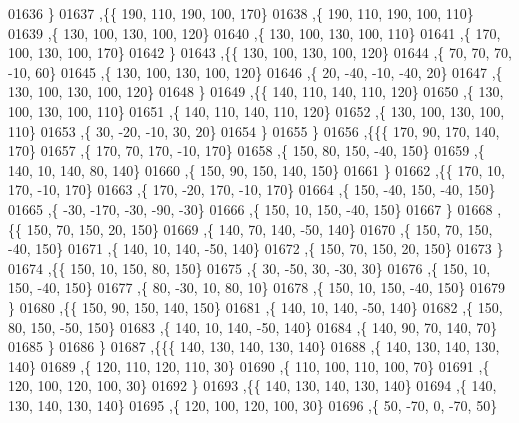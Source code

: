 \begin{DoxyCode}
01636     \}
01637    ,\{\{   190,   110,   190,   100,   170\}
01638     ,\{   190,   110,   190,   100,   110\}
01639     ,\{   130,   100,   130,   100,   120\}
01640     ,\{   130,   100,   130,   100,   110\}
01641     ,\{   170,   100,   130,   100,   170\}
01642     \}
01643    ,\{\{   130,   100,   130,   100,   120\}
01644     ,\{    70,    70,    70,   -10,    60\}
01645     ,\{   130,   100,   130,   100,   120\}
01646     ,\{    20,   -40,   -10,   -40,    20\}
01647     ,\{   130,   100,   130,   100,   120\}
01648     \}
01649    ,\{\{   140,   110,   140,   110,   120\}
01650     ,\{   130,   100,   130,   100,   110\}
01651     ,\{   140,   110,   140,   110,   120\}
01652     ,\{   130,   100,   130,   100,   110\}
01653     ,\{    30,   -20,   -10,    30,    20\}
01654     \}
01655    \}
01656   ,\{\{\{   170,    90,   170,   140,   170\}
01657     ,\{   170,    70,   170,   -10,   170\}
01658     ,\{   150,    80,   150,   -40,   150\}
01659     ,\{   140,    10,   140,    80,   140\}
01660     ,\{   150,    90,   150,   140,   150\}
01661     \}
01662    ,\{\{   170,    10,   170,   -10,   170\}
01663     ,\{   170,   -20,   170,   -10,   170\}
01664     ,\{   150,   -40,   150,   -40,   150\}
01665     ,\{   -30,  -170,   -30,   -90,   -30\}
01666     ,\{   150,    10,   150,   -40,   150\}
01667     \}
01668    ,\{\{   150,    70,   150,    20,   150\}
01669     ,\{   140,    70,   140,   -50,   140\}
01670     ,\{   150,    70,   150,   -40,   150\}
01671     ,\{   140,    10,   140,   -50,   140\}
01672     ,\{   150,    70,   150,    20,   150\}
01673     \}
01674    ,\{\{   150,    10,   150,    80,   150\}
01675     ,\{    30,   -50,    30,   -30,    30\}
01676     ,\{   150,    10,   150,   -40,   150\}
01677     ,\{    80,   -30,    10,    80,    10\}
01678     ,\{   150,    10,   150,   -40,   150\}
01679     \}
01680    ,\{\{   150,    90,   150,   140,   150\}
01681     ,\{   140,    10,   140,   -50,   140\}
01682     ,\{   150,    80,   150,   -50,   150\}
01683     ,\{   140,    10,   140,   -50,   140\}
01684     ,\{   140,    90,    70,   140,    70\}
01685     \}
01686    \}
01687   ,\{\{\{   140,   130,   140,   130,   140\}
01688     ,\{   140,   130,   140,   130,   140\}
01689     ,\{   120,   110,   120,   110,    30\}
01690     ,\{   110,   100,   110,   100,    70\}
01691     ,\{   120,   100,   120,   100,    30\}
01692     \}
01693    ,\{\{   140,   130,   140,   130,   140\}
01694     ,\{   140,   130,   140,   130,   140\}
01695     ,\{   120,   100,   120,   100,    30\}
01696     ,\{    50,   -70,     0,   -70,    50\}

\end{DoxyCode}
